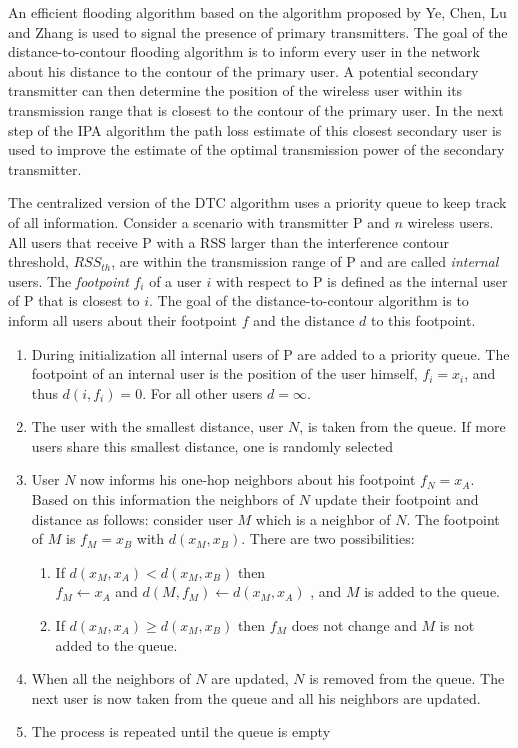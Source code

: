 An efficient flooding algorithm based on the algorithm proposed by Ye, Chen, Lu and Zhang \cite{dtc} is used to signal the presence of primary transmitters. The goal of the distance-to-contour flooding algorithm is to inform every user in the network about his distance to the contour of the primary user. A potential secondary transmitter can then determine the position of the wireless user within its transmission range that is closest to the contour of the primary user. In the next step of the IPA algorithm the path loss estimate of this closest secondary user is used to improve the estimate of the optimal transmission power of the secondary transmitter.

The centralized version of the DTC algorithm uses a priority queue to keep track of all information. Consider a scenario with transmitter P and $n$ wireless users. All users that receive P with a RSS larger than the interference contour threshold, $RSS_{th}$, are within the transmission range of P and are called \textit{internal} users. The \textit{footpoint} $f_i$ of a user $i$ with respect to P is defined as the internal user of P that is closest to $i$. The goal of the distance-to-contour algorithm is to inform all users about their footpoint $f$ and the distance $d$ to this footpoint.


\begin{enumerate}
\item During initialization all internal users of P are added to a priority queue. The footpoint of an internal user is the position of the user himself, $f_i = x_i$, and thus $d(i,f_i) = 0$. For all other users $d = \infty$.
\item The user with the smallest distance, user $N$, is taken from the queue. If more users share this smallest distance, one is randomly selected
\item User $N$ now informs his one-hop neighbors about his footpoint $f_N=x_A$. Based on this information the neighbors of $N$ update their footpoint and distance as follows: consider user $M$ which is a neighbor of $N$. The footpoint of $M$ is $f_M=x_B$ with $d(x_M,x_B)$. There are two possibilities:
\begin{enumerate}
 \item If $d(x_M,x_A) < d(x_M,x_B)$ then \\	
	$f_M \leftarrow x_A$ and $d(M,f_M) \leftarrow d(x_M,x_A)$ 
	, and $M$ is added to the queue.
 \item If $d(x_M,x_A) \geq d(x_M,x_B)$ then $f_M$ does not change and $M$ is not added to the queue.
\end{enumerate} 
 
\item When all the neighbors of $N$ are updated, $N$ is removed from the queue. The next user is now taken from the queue and all his neighbors are updated.
\item The process is repeated until the queue is empty
\end{enumerate}


